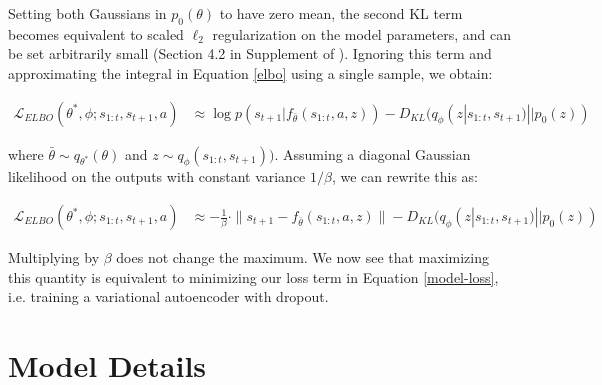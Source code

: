 \documentclass{article} %
\begin{document}
Setting both Gaussians in $p_0(\theta)$ to have zero mean, the second KL term becomes equivalent to scaled $\ell_2$ regularization on the model parameters, and can be set arbitrarily small (Section 4.2 in Supplement of \citep{Gal16}). 
Ignoring this term and approximating the integral in Equation \ref{elbo} using a single sample, we obtain:

\begin{align*}
  \mathcal{L}_{ELBO}(\theta^*, \phi; s_{1:t}, s_{t+1}, a) &\approx \log p(s_{t+1} | f_{\bar{\theta}}(s_{1:t}, a, z)) - D_{KL}(q_\phi(z | s_{1:t}, s_{t+1}) || p_0(z)) 
\end{align*}

where $\bar{\theta} \sim q_{\theta^*}(\theta)$ and $z \sim q_\phi(s_{1:t}, s_{t+1}))$. Assuming a diagonal Gaussian likelihood on the outputs with constant variance $1/\beta$, we can rewrite this as:

\begin{align*}
  \mathcal{L}_{ELBO}(\theta^*, \phi; s_{1:t}, s_{t+1}, a) &\approx -\frac{1}{\beta} \cdot \| s_{t+1} - f_{\bar{\theta}}(s_{1:t}, a, z) \| - D_{KL}(q_\phi(z | s_{1:t}, s_{t+1}) || p_0(z)) 
\end{align*}

Multiplying by $\beta$ does not change the maximum. We now see that maximizing this quantity is equivalent to minimizing our loss term in Equation \ref{model-loss}, i.e. training a variational autoencoder with dropout. 




\section{Model Details}
\label{model-details}
\end{document}
